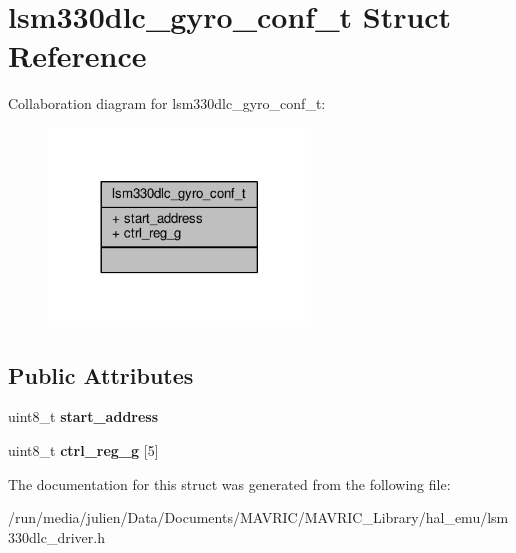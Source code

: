 \hypertarget{structlsm330dlc__gyro__conf__t}{\section{lsm330dlc\+\_\+gyro\+\_\+conf\+\_\+t Struct Reference}
\label{structlsm330dlc__gyro__conf__t}
}


Collaboration diagram for lsm330dlc\+\_\+gyro\+\_\+conf\+\_\+t\+:
\nopagebreak
\begin{figure}[H]
\begin{center}
\leavevmode
\includegraphics[width=197pt]{structlsm330dlc__gyro__conf__t__coll__graph}
\end{center}
\end{figure}
\subsection*{Public Attributes}
\begin{DoxyCompactItemize}
\item 
\hypertarget{structlsm330dlc__gyro__conf__t_a581bab5db0ea30e08f867f5e5fba5cf5}{uint8\+\_\+t {\bfseries start\+\_\+address}}\label{structlsm330dlc__gyro__conf__t_a581bab5db0ea30e08f867f5e5fba5cf5}

\item 
\hypertarget{structlsm330dlc__gyro__conf__t_a55981aaddab6f68d233886cb72197396}{uint8\+\_\+t {\bfseries ctrl\+\_\+reg\+\_\+g} \mbox{[}5\mbox{]}}\label{structlsm330dlc__gyro__conf__t_a55981aaddab6f68d233886cb72197396}

\end{DoxyCompactItemize}


The documentation for this struct was generated from the following file\+:\begin{DoxyCompactItemize}
\item 
/run/media/julien/\+Data/\+Documents/\+M\+A\+V\+R\+I\+C/\+M\+A\+V\+R\+I\+C\+\_\+\+Library/hal\+\_\+emu/lsm330dlc\+\_\+driver.\+h\end{DoxyCompactItemize}
